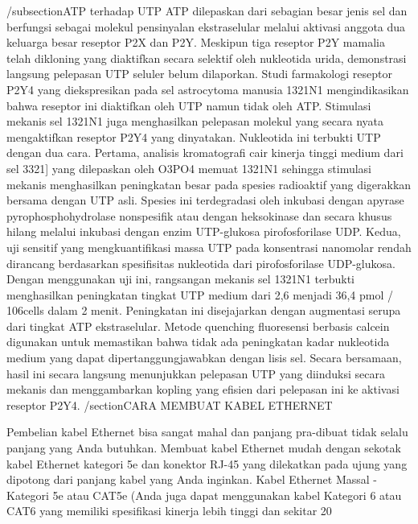 /subsection{ATP terhadap UTP}
ATP dilepaskan dari sebagian besar jenis sel dan berfungsi sebagai molekul pensinyalan ekstraselular melalui aktivasi anggota dua keluarga besar reseptor P2X dan P2Y. Meskipun tiga reseptor P2Y mamalia telah dikloning yang diaktifkan secara selektif oleh nukleotida urida, demonstrasi langsung pelepasan UTP seluler belum dilaporkan. Studi farmakologi reseptor P2Y4 yang diekspresikan pada sel astrocytoma manusia 1321N1 mengindikasikan bahwa reseptor ini diaktifkan oleh UTP namun tidak oleh ATP. Stimulasi mekanis sel 1321N1 juga menghasilkan pelepasan molekul yang secara nyata mengaktifkan reseptor P2Y4 yang dinyatakan. Nukleotida ini terbukti UTP dengan dua cara. Pertama, analisis kromatografi cair kinerja tinggi medium dari sel 3321] yang dilepaskan oleh O3PO4 memuat 1321N1 sehingga stimulasi mekanis menghasilkan peningkatan besar pada spesies radioaktif yang digerakkan bersama dengan UTP asli. Spesies ini terdegradasi oleh inkubasi dengan apyrase pyrophosphohydrolase nonspesifik atau dengan heksokinase dan secara khusus hilang melalui inkubasi dengan enzim UTP-glukosa pirofosforilase UDP. Kedua, uji sensitif yang mengkuantifikasi massa UTP pada konsentrasi nanomolar rendah dirancang berdasarkan spesifisitas nukleotida dari pirofosforilase UDP-glukosa. Dengan menggunakan uji ini, rangsangan mekanis sel 1321N1 terbukti menghasilkan peningkatan tingkat UTP medium dari 2,6 menjadi 36,4 pmol / 106cells dalam 2 menit. Peningkatan ini disejajarkan dengan augmentasi serupa dari tingkat ATP ekstraselular. Metode quenching fluoresensi berbasis calcein digunakan untuk memastikan bahwa tidak ada peningkatan kadar nukleotida medium yang dapat dipertanggungjawabkan dengan lisis sel. Secara bersamaan, hasil ini secara langsung menunjukkan pelepasan UTP yang diinduksi secara mekanis dan menggambarkan kopling yang efisien dari pelepasan ini ke aktivasi reseptor P2Y4.
/section{CARA MEMBUAT KABEL ETHERNET}

Pembelian kabel Ethernet bisa sangat mahal dan panjang pra-dibuat tidak selalu panjang yang Anda butuhkan. Membuat kabel Ethernet mudah dengan sekotak kabel Ethernet kategori 5e dan konektor RJ-45 yang dilekatkan pada ujung yang dipotong dari panjang kabel yang Anda inginkan.
Kabel Ethernet Massal - Kategori 5e atau CAT5e
(Anda juga dapat menggunakan kabel Kategori 6 atau CAT6 yang memiliki spesifikasi kinerja lebih tinggi dan sekitar 20%

